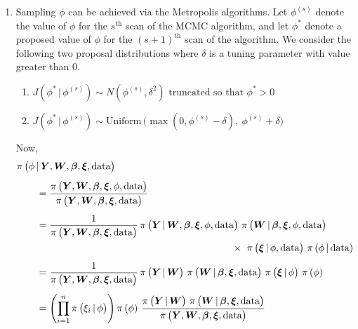 \documentclass[11pt]{article}
\renewcommand{\vec}{\boldsymbol}
\newcommand{\barS}{\,|\,}
\begin{document}
\begin{enumerate}[label=Step \arabic*., leftmargin=13mm, itemsep=10mm]
\item Sampling $\phi$ can be achieved via the Metropolis algorithms.  Let $\phi^{(s)}$ denote the value of $\phi$ for the $s^{\text{th}}$ scan of the MCMC algorithm, and let $\phi^*$ denote a proposed value of $\phi$ for the $(s+1)^{\text{th}}$ scan of the algorithm.  We consider the following two proposal distributions where $\delta$ is a tuning parameter with value greater than 0. \vspace{2mm}

\begin{enumerate}[label=(\roman*), itemsep=3mm]
\item $ J\left( \phi^* \barS \phi^{(s)} \right) \sim N\left( \phi^{(s)}, \delta^2 \right) \text{ truncated so that $\phi^* > 0$} $
\item $ J\left( \phi^* \barS \phi^{(s)} \right) \sim \text{Uniform}\, \Big( \max\left(0, \phi^{(s)} - \delta\right),~ \phi^{(s)} + \delta \Big) $
\end{enumerate} \vspace{6mm}

Now,
\begin{align*} \MoveEqLeft
\pi\, \big( \phi \barS \vec{Y}, \vec{W}, \vec{\beta}, \vec{\xi}, \text{data} \big) \\[1ex]
&= \frac{ \pi\,\big( \vec{Y}, \vec{W}, \vec{\beta}, \vec{\xi}, \phi, \text{data} \big) }{ \pi\,\big( \vec{Y}, \vec{W}, \vec{\beta}, \vec{\xi}, \text{data} \big) } \\[1ex]
&= \frac{ 1 }{ \pi\,\big( \vec{Y}, \vec{W}, \vec{\beta}, \vec{\xi}, \text{data} \big) }\, \pi\,\big( \vec{Y} \barS \vec{W}, \vec{\beta}, \vec{\xi}, \phi, \text{data} \big)~ \pi\,\big( \vec{W} \barS \vec{\beta}, \vec{\xi}, \phi, \text{data} \big)\\
& \hspace{70mm} \times~ \pi\,\big( \vec{\xi} \barS \phi, \text{data} \big)~ \pi\,(\phi \barS \text{data}) \\[1ex]
&= \frac{ 1 }{ \pi\,\big( \vec{Y}, \vec{W}, \vec{\beta}, \vec{\xi}, \text{data} \big) }\, \pi\,\big( \vec{Y} \barS \vec{W} \big)~ \pi\,\big( \vec{W} \barS \vec{\beta}, \vec{\xi}, \text{data} \big)~ \pi\,\big( \vec{\xi} \barS \phi \big)~ \pi\,(\phi) \\[1ex]
&= \left( \prod_{i=1}^n \pi\,\big( \xi_i \barS \phi \big) \right) \pi\,(\phi)~ \frac{ \pi\,\big( \vec{Y} \barS \vec{W} \big)~ \pi\,\big( \vec{W} \barS \vec{\beta}, \vec{\xi}, \text{data} \big) }{ \pi\,\big( \vec{Y}, \vec{W}, \vec{\beta}, \vec{\xi}, \text{data} \big) }
\end{align*}



\end{enumerate}
\end{document}
